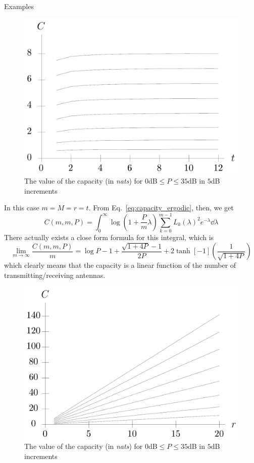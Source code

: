 \begin{frame}[allowframebreaks]{Examples}
\begin{example}[$r=1$]
	\begin{figure}
		\centering
		\includegraphics[width=0.6\linewidth]{img/capacity_r1}
		\caption{The value of the capacity (in \textit{nats}) for $0$dB$\leq P\leq 35$dB in $5$dB increments}
		\label{fig:capacity_r1}
	\end{figure}
\end{example}

\begin{example}[$r=t$]
	In this case $m=M=r=t$. From Eq.~\eqref{eq:capacity_ergodic}, then, we get
	$$C(m,m,P) =
	\int_0^\infty \log(1+\frac{P}{m}\lambda)
	\sum_{k=0}^{m-1} L_k(\lambda)^2 e^{-\lambda}
	\dd{\lambda}$$
	There actually exists a close form formula for this integral, which is
	\begin{equation}
	\lim_{m\rightarrow\infty} \frac{C(m,m,P)}{m} =
	\log P -1+ \frac{\sqrt{1+4P}-1}{2P} + 2\tanh[-1](\frac{1}{\sqrt{1+4P}})
	\end{equation}
	which clearly means that the capacity is a linear function of the number of transmitting/receiving antennas.
\end{example}

\begin{example}[$r=t$]
	\begin{figure}
		\centering
		\includegraphics[width=0.7\linewidth]{img/capacity_rt}
		\caption{The value of the capacity (in \textit{nats}) for $0$dB$\leq P\leq 35$dB in $5$dB increments}
		\label{fig:capacity_rt}
	\end{figure}
\end{example}

\end{frame}